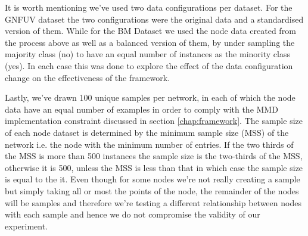 \documentclass{mpaper}
\begin{document}
It is worth mentioning we've used two data configurations per dataset. For the GNFUV dataset the two configurations were the original data and a standardised version of them. While for the BM Dataset we used the node data created from the process above as well as a balanced version of them, by under sampling the majority class (no) to have an equal number of instances as the minority class (yes). In each case this was done to explore the effect of the data configuration change on the effectiveness of the framework. 

Lastly, we've drawn 100 unique samples per network, in each of which the node data have an equal number of examples in order to comply with the MMD implementation constraint discussed in section \ref{chap:framework}. The sample size of each node dataset is determined by the minimum sample size (MSS) of the network i.e. the node with the minimum number of entries. If the two thirds of the MSS is more than 500 instances the sample size is the two-thirds of the MSS, otherwise it is 500, unless the MSS is less than that in which case the sample size is equal to the it. Even though for some nodes we're not really creating a sample but simply taking all or most the points of the node, the remainder of the nodes will be samples and therefore we're testing a different relationship between nodes with each sample and hence we do not compromise the validity of our experiment.
\end{document}
